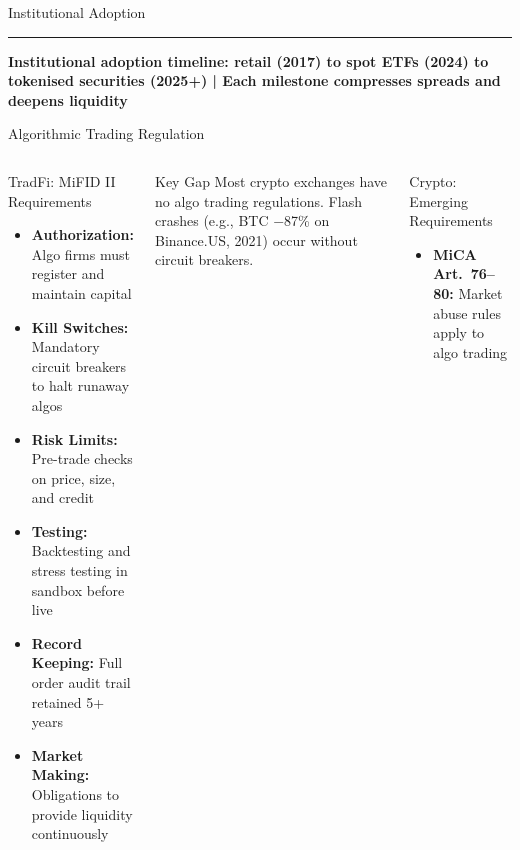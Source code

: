 \documentclass[8pt,aspectratio=169]{beamer}
\newcommand{\bottomnote}[1]{\vfill\vspace{-2mm}\textcolor{mllavender2}{\rule{\textwidth}{0.4pt}}\vspace{1mm}\footnotesize\textbf{#1}}
\begin{document}
\begin{frame}{Institutional Adoption}
\bottomnote{Institutional adoption timeline: retail (2017) to spot ETFs (2024) to tokenised securities (2025+) | Each milestone compresses spreads and deepens liquidity}
\end{frame}

\begin{frame}{Algorithmic Trading Regulation}
\begin{columns}[T]
\begin{block}{TradFi: MiFID II Requirements}
\begin{itemize}\setlength{\itemsep}{3pt}
  \item \textbf{Authorization:} Algo firms must register and maintain capital
  \item \textbf{Kill Switches:} Mandatory circuit breakers to halt runaway algos
  \item \textbf{Risk Limits:} Pre-trade checks on price, size, and credit
  \item \textbf{Testing:} Backtesting and stress testing in sandbox before live
  \item \textbf{Record Keeping:} Full order audit trail retained 5+ years
  \item \textbf{Market Making:} Obligations to provide liquidity continuously
\end{itemize}
\end{block}
\vspace{2mm}
\begin{alertblock}{Key Gap}
\scriptsize Most crypto exchanges have no algo trading regulations. Flash crashes (e.g., BTC $-$87\% on Binance.US, 2021) occur without circuit breakers.
\end{alertblock}
\begin{block}{Crypto: Emerging Requirements}
\begin{itemize}\setlength{\itemsep}{3pt}
  \item \textbf{MiCA Art.\ 76--80:} Market abuse rules apply to algo trading

\end{itemize}
\end{block}
\end{columns}
\end{frame}
\end{document}
